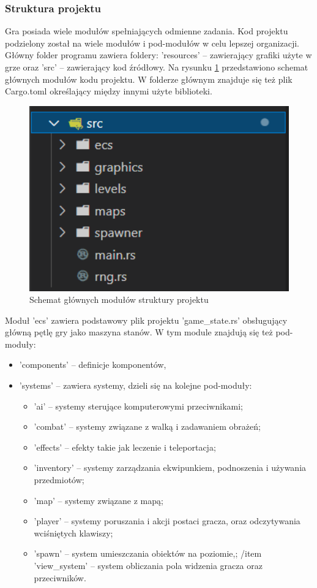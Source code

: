 \documentclass[12pt,twoside]{article}
\begin{document}
\subsubsection{Struktura projektu}
Gra posiada wiele modułów spełniających odmienne zadania. Kod projektu podzielony został na wiele modułów i pod-modułów w celu lepszej organizacji. Główny folder programu zawiera foldery: 'resources' -- zawierający grafiki użyte w grze oraz 'src' -- zawierający kod źródłowy. Na rysunku \ref{code:main_structure} przedstawiono schemat głównych modułów kodu projektu. W folderze głównym znajduje się też plik Cargo.toml określający między innymi użyte biblioteki.

\begin{figure}[ht]
	\centering
	\includegraphics[width=12cm]{images/code/main_structure.png}
	\caption{Schemat głównych modułów struktury projektu}
	\label{code:main_structure}
\end{figure}
\FloatBarrier

Moduł 'ecs' zawiera podstawowy plik projektu 'game\_state.rs' obsługujący główną pętlę gry jako maszyna stanów. W tym module znajdują się też pod-moduły:
 
 \begin{itemize}
 	\item 'components' -- definicje komponentów,
 	\item 'systems' -- zawiera systemy, dzieli się na kolejne pod-moduły: 
 	\begin{itemize}
 		\item 'ai' -- systemy sterujące komputerowymi przeciwnikami;
 		\item 'combat' -- systemy związane z walką i zadawaniem obrażeń;
 		\item 'effects' -- efekty takie jak leczenie i teleportacja;
 		\item 'inventory' -- systemy zarządzania ekwipunkiem, podnoszenia i używania przedmiotów;
 		\item 'map' -- systemy związane z mapą;
 		\item 'player' -- systemy poruszania i akcji postaci gracza, oraz odczytywania wciśniętych klawiszy;
 		\item 'spawn' -- system umieszczania obiektów na poziomie,;
 		/item 'view\_system' -- system obliczania pola widzenia gracza oraz przeciwników.
 	\end{itemize}
 \end{itemize}
 
\end{document}
